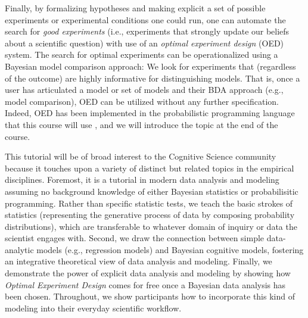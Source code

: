 \documentclass[10pt,letterpaper]{article}
\newcommand{\ndg}[1]{\textcolor{green}{[ndg: #1]}}
\begin{document}
Finally, by formalizing hypotheses and making explicit a set of possible experiments or experimental conditions one could run, one can automate the search for \emph{good experiments} (i.e., experiments that strongly update our beliefs about a scientific question) with use of an \emph{optimal experiment design} (OED) system.
The search for optimal experiments can be operationalized using a Bayesian model comparison approach: We look for experiments that (regardless of the outcome) are highly informative for distinguishing models. 
That is, once a user has articulated a model or set of models and their BDA approach (e.g., model comparison), OED can be utilized without any further specification. 
Indeed, OED has been implemented in the probabilistic programming language that this course will use \cite{ouyangArxivOED}, and we will introduce the topic at the end of the course.




This tutorial will be of broad interest to the Cognitive Science community because it touches upon a variety of distinct but related topics in the empirical disciplines. 
Foremost, it is a tutorial in modern data analysis and modeling assuming no background knowledge of either Bayesian statistics or probabilisitic programming. 
Rather than specific statistic tests, we teach the basic strokes of statistics (representing the generative process of data by composing probability distributions), which are transferable to whatever domain of inquiry or data the scientist engages with. 
Second, we draw the connection between simple data-analytic models (e.g., regression models) and Bayesian cognitive models, fostering an integrative theoretical view of data analysis and modeling.
Finally, we demonstrate the power of explicit data analysis and modeling by showing how \emph{Optimal Experiment Design} comes for free once a Bayesian data analysis has been chosen.
Throughout, we show participants how to incorporate this kind of modeling into their everyday scientific workflow. 
\end{document}
